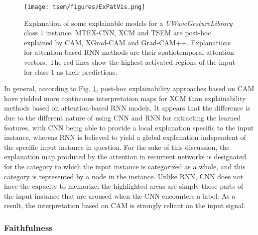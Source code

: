 \documentclass{svproc}
\begin{document}
\begin{figure}[h!]
\centering
\texttt{[image: tsem/figures/ExPatVis.png]}
\caption{Explanation of some explainable models for a \textit{UWaveGestureLibrary} class 1 instance. MTEX-CNN, XCM and TSEM are post-hoc explained by CAM, XGrad-CAM and Grad-CAM++. Explanations for attention-based RNN methods are their spatiotemporal attention vectors. The red lines show the highest activated regions of the input for class 1 as their predictions.}
\label{fig:expatvis}
\end{figure}

In general, according to Fig. \ref{fig:expatvis}, post-hoc explainability approaches based on CAM have yielded more continuous interpretation maps for XCM than explainability methods based on attention-based RNN models. It appears that the difference is due to the different nature of using CNN and RNN for extracting the learned features, with CNN being able to provide a local explanation specific to the input instance, whereas RNN is believed to yield a global explanation independent of the specific input instance in question. For the sake of this discussion, the explanation map produced by the attention in recurrent networks is designated for the category to which the input instance is categorized as a whole, and this category is represented by a node in the instance. Unlike RNN, CNN does not have the capacity to memorize; the highlighted areas are simply those parts of the input instance that are aroused when the CNN encounters a label. As a result, the interpretation based on CAM is strongly reliant on the input signal.

\subsubsection{Faithfulness}
\end{document}
